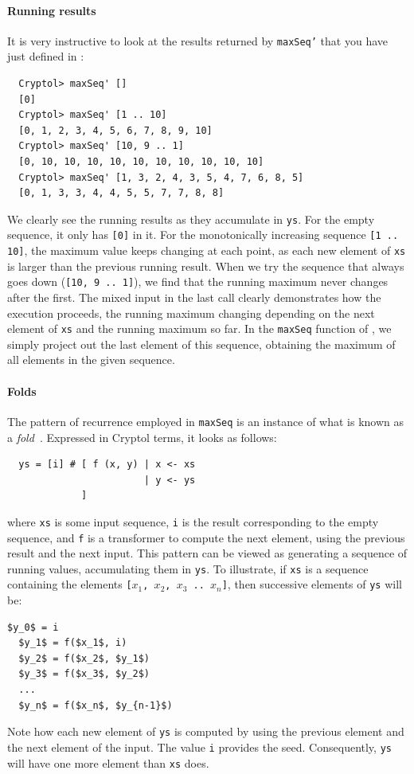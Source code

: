 \paragraph*{Running results} It is very instructive to look at the
results returned by {\tt maxSeq'} that you have just defined in
:
\begin{Verbatim}
  Cryptol> maxSeq' []
  [0]
  Cryptol> maxSeq' [1 .. 10]
  [0, 1, 2, 3, 4, 5, 6, 7, 8, 9, 10]
  Cryptol> maxSeq' [10, 9 .. 1]
  [0, 10, 10, 10, 10, 10, 10, 10, 10, 10, 10]
  Cryptol> maxSeq' [1, 3, 2, 4, 3, 5, 4, 7, 6, 8, 5]
  [0, 1, 3, 3, 4, 4, 5, 5, 7, 7, 8, 8]
\end{Verbatim}
We clearly see the running results as they accumulate in {\tt ys}. For
the empty sequence, it only has {\tt [0]} in it. For the monotonically
increasing sequence {\tt \Verb+[1 .. 10]+}, the maximum value keeps
changing at each point, as each new element of {\tt xs} is larger than
the previous running result. When we try the sequence that always goes
down ({\tt [10, 9 .. 1]}), we find that the running maximum never
changes after the first. The mixed input in the last call clearly
demonstrates how the execution proceeds, the running maximum changing
depending on the next element of {\tt xs} and the running maximum so
far. In the {\tt maxSeq} function of , we
simply project out the last element of this sequence, obtaining the
maximum of all elements in the given sequence.

\paragraph*{Folds}\label{par:fold}\indFold The pattern of recurrence
employed in {\tt maxSeq} is an instance of what is known as a {\em
  fold}~\cite{Bir98}.  Expressed in Cryptol terms, it looks as
follows:
\begin{Verbatim}
  ys = [i] # [ f (x, y) | x <- xs
                        | y <- ys
             ]
\end{Verbatim}
where {\tt xs} is some input sequence, {\tt i} is the result
corresponding to the empty sequence, and {\tt f} is a transformer to
compute the next element, using the previous result and the next
input.  This pattern can be viewed as generating a sequence of running
values, accumulating them in {\tt ys}. To illustrate, if {\tt xs} is a
sequence containing the elements {\tt [$x_1$, $x_2$, $x_3$ .. $x_n$]},
then successive elements of {\tt ys} will be:
\begin{Verbatim}[commandchars=\\\{\}, codes={\catcode`$=3\catcode`^=7\catcode`_=8}]
  $y_0$ = i
  $y_1$ = f($x_1$, i)
  $y_2$ = f($x_2$, $y_1$)
  $y_3$ = f($x_3$, $y_2$)
  ...
  $y_n$ = f($x_n$, $y_{n-1}$)
\end{Verbatim}
Note how each new element of {\tt ys} is computed by using the
previous element and the next element of the input. The value {\tt i}
provides the seed. Consequently, {\tt ys} will have one more element
than {\tt xs} does.

